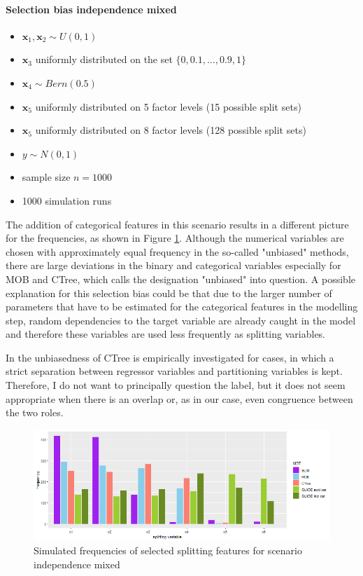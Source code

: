 \paragraph{Selection bias independence mixed}
\begin{itemize}
    \item $\textbf{x}_{1}, \textbf{x}_{2} \sim U(0,1)$ 
    \item $\textbf{x}_3$ uniformly distributed on the set $\{0, 0.1,..., 0.9, 1\}$ 
    \item $\textbf{x}_4  \sim Bern(0.5)$ 
    \item $\textbf{x}_5$ uniformly distributed on 5 factor levels (15 possible split sets) 
    \item $\textbf{x}_5$ uniformly distributed on 8 factor levels (128 possible split sets) %
    \item $y \sim N(0,1)$
    \item sample size $n = 1000$
    \item 1000 simulation runs
\end{itemize}

The addition of categorical features in this scenario results in a different picture for the frequencies, as shown in Figure \ref{fig:selection_bias_independence_mixed}. Although the numerical variables are chosen with approximately equal frequency in the so-called "unbiased" methods, there are large deviations in the binary and categorical variables especially for MOB and CTree, which calls the designation "unbiased" into question. 
A possible explanation for this selection bias could be that due to the larger number of parameters that have to be estimated for the categorical features in the modelling step, random dependencies to the target variable are already caught in the model and therefore these variables are used less frequently as splitting variables.


In \citep{Hothorn.2006} the unbiasedness of CTree is empirically investigated for cases, in which a strict separation between regressor variables and partitioning variables is kept. Therefore, I do not want to principally question the label, but it does not seem appropriate when there is an overlap or, as in our case, even congruence between the two roles.


\begin{figure}[!htb]
    \centering
    \includegraphics[width=16cm]{Figures/simulations/batchtools/selection_bias_general/independence_mixed.png}
    \caption{Simulated frequencies of selected splitting features for scenario independence mixed}
    \label{fig:selection_bias_independence_mixed}
\end{figure}

